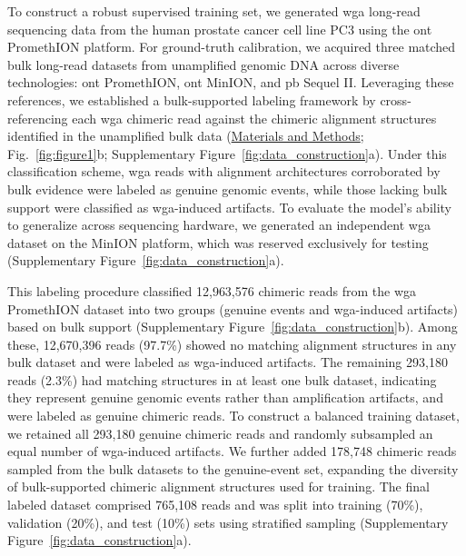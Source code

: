 \documentclass[pdflatex,lineno]{sn-jnl}%
\begin{document}
To construct a robust supervised training set, we generated \gls{wga} long-read sequencing data from the human prostate cancer cell line PC3 using the \gls{ont} PromethION platform.
For ground-truth calibration, we acquired three matched bulk long-read datasets from unamplified genomic DNA across diverse technologies: \gls{ont} PromethION, \gls{ont} MinION, and \gls{pb} Sequel II.
Leveraging these references, we established a bulk-supported labeling framework by cross-referencing each \gls{wga} chimeric read against the chimeric alignment structures identified in the unamplified bulk data (\hyperref[sec:methods]{Materials and Methods}; Fig.~\ref{fig:figure1}b; Supplementary Figure~\ref{fig:data_construction}a).
Under this classification scheme, \gls{wga} reads with alignment architectures corroborated by bulk evidence were labeled as genuine genomic events, while those lacking bulk support were classified as \gls{wga}-induced artifacts.
To evaluate the model's ability to generalize across sequencing hardware, we generated an independent \gls{wga} dataset on the MinION platform, which was reserved exclusively for testing (Supplementary Figure~\ref{fig:data_construction}a).

This labeling procedure classified 12,963,576 chimeric reads from the \gls{wga} PromethION dataset into two groups (genuine events and \gls{wga}-induced artifacts) based on bulk support (Supplementary Figure~\ref{fig:data_construction}b).
Among these, 12,670,396 reads (97.7\%) showed no matching alignment structures in any bulk dataset and were labeled as \gls{wga}-induced artifacts.
The remaining 293,180 reads (2.3\%) had matching structures in at least one bulk dataset, indicating they represent genuine genomic events rather than amplification artifacts, and were labeled as genuine chimeric reads.
To construct a balanced training dataset, we retained all 293,180 genuine chimeric reads and randomly subsampled an equal number of \gls{wga}-induced artifacts.
We further added 178,748 chimeric reads sampled from the bulk datasets to the genuine-event set, expanding the diversity of bulk-supported chimeric alignment structures used for training.
The final labeled dataset comprised 765,108 reads and was split into training (70\%), validation (20\%), and test (10\%) sets using stratified sampling (Supplementary Figure~\ref{fig:data_construction}a).
\end{document}

